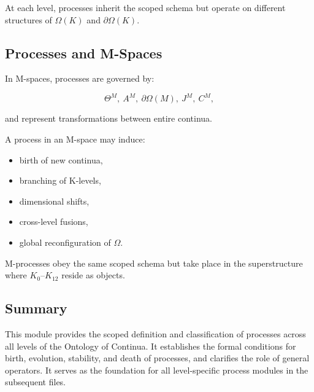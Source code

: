 At each level, processes inherit the scoped schema but operate on
different structures of $\Omega(K)$ and $\partial\Omega(K)$.

\subsection{Processes and M-Spaces}

In M-spaces, processes are governed by:

\[
\Theta^M,\
A^M,\
\partial\Omega(M),\
J^M,\
C^M,
\]

and represent transformations between entire continua.

A process in an M-space may induce:

\begin{itemize}
    \item birth of new continua,
    \item branching of K-levels,
    \item dimensional shifts,
    \item cross-level fusions,
    \item global reconfiguration of $\Omega$.
\end{itemize}

M-processes obey the same scoped schema but take place in the
superstructure where $K_0$--$K_{12}$ reside as objects.

\subsection{Summary}

This module provides the scoped definition and classification of processes
across all levels of the Ontology of Continua.
It establishes the formal conditions for birth, evolution, stability,
and death of processes, and clarifies the role of general operators.
It serves as the foundation for all level-specific process modules in
the subsequent files.
